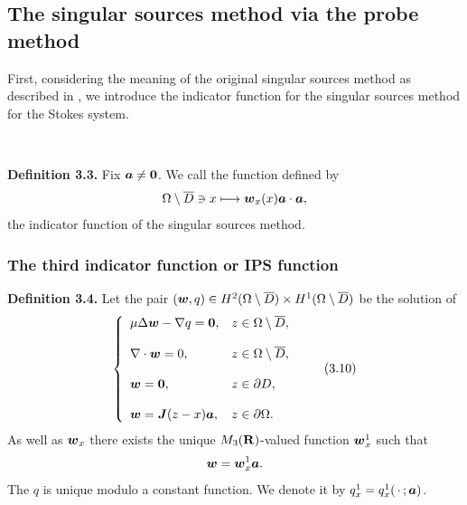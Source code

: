   
  
  






\subsection{The singular sources method via the probe method}


 First, considering the meaning of the original singular sources method as described in \cite{IPS},
 we introduce the indicator function for the singular sources method for the Stokes system.
 
 $\quad$
 
 {\bf\noindent Definition 3.3.}  Fix  $\mbox{\boldmath $a$}\not=\mbox{\boldmath $0$}$.
 We call the function defined by
 $$\displaystyle
 \Omega\setminus\overline{D}\ni x\longmapsto \mbox{\boldmath $w$}_x(x)\mbox{\boldmath $a$}\cdot\mbox{\boldmath $a$},
 $$ 
 the  indicator function of the singular sources method.
 
 
 
 \subsubsection{The third indicator function or IPS function}
 
 
 

 
 
 
{\bf\noindent Definition 3.4.}
Let the pair $(\mbox{\boldmath $w$},q)\in H^2(\Omega\setminus\overline{D})\times H^1(\Omega\setminus\overline{D})$ be
the solution of
$$\left\{
 \begin{array}{ll}
 \mu\Delta\mbox{\boldmath $w$}-\nabla q=\mbox{\boldmath $0$}, & z\in\Omega\setminus\overline{D},
 \\
 \\
 \displaystyle
 \nabla\cdot\mbox{\boldmath $w$}=0, &  z\in\Omega\setminus\overline{D},\\
 \\
 \displaystyle
 \mbox{\boldmath $w$}=\mbox{\boldmath $0$}, & z\in\partial D,
 \\
 \\
 \displaystyle
 \mbox{\boldmath $w$}=\mbox{\boldmath $J$}(z-x)
 \mbox{\boldmath $a$}, & z\in\partial\Omega.
 \end{array}
 \right.
 \tag {3.10}
 $$
 As well as $\mbox{\boldmath $w$}_x$ there exists the unique
 $M_3(\Bbb R)$-valued function $\mbox{\boldmath $w$}_x^1$ such that
 $$\displaystyle
 \mbox{\boldmath $w$}=\mbox{\boldmath $w$}_x^1\mbox{\boldmath $a$}.
 $$
 The $q$ is unique modulo a constant function.  We denote it by $q_x^1=q_x^1(\,\cdot\,;\mbox{\boldmath $a$})$.
 
